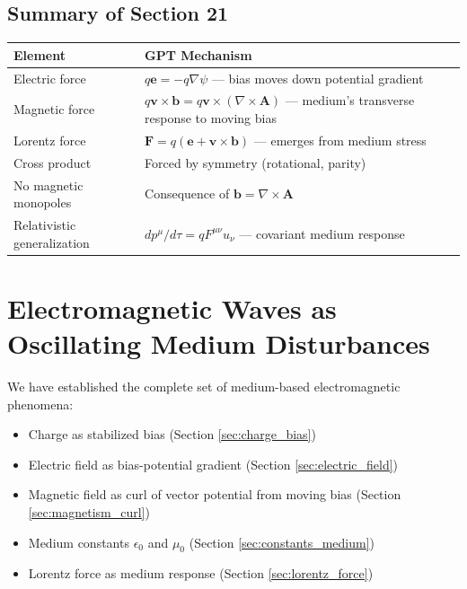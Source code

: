 \documentclass[12pt, a4paper]{article}
\begin{document}
\subsection{Summary of Section 21}
\label{subsec:summary_21}

\begin{center}
\begin{tabular}{|p{4cm}|p{10cm}|}
\hline
\textbf{Element} & \textbf{GPT Mechanism} \\
\hline
Electric force & \( q\mathbf{e} = -q\nabla \psi \) — bias moves down potential gradient \\
\hline
Magnetic force & \( q\mathbf{v} \times \mathbf{b} = q\mathbf{v} \times (\nabla \times \mathbf{A}) \) — medium's transverse response to moving bias \\
\hline
Lorentz force & \( \mathbf{F} = q(\mathbf{e} + \mathbf{v} \times \mathbf{b}) \) — emerges from medium stress \\
\hline
Cross product & Forced by symmetry (rotational, parity) \\
\hline
No magnetic monopoles & Consequence of \( \mathbf{b} = \nabla \times \mathbf{A} \) \\
\hline
Relativistic generalization & \( dp^\mu/d\tau = q F^{\mu\nu} u_\nu \) — covariant medium response \\
\hline
\end{tabular}
\end{center}

\section{Electromagnetic Waves as Oscillating Medium Disturbances}
\label{sec:em_waves}

We have established the complete set of medium-based electromagnetic phenomena:
\begin{itemize}
    \item Charge as stabilized bias (Section \ref{sec:charge_bias})
    \item Electric field as bias-potential gradient (Section \ref{sec:electric_field})
    \item Magnetic field as curl of vector potential from moving bias (Section \ref{sec:magnetism_curl})
    \item Medium constants \( \epsilon_0 \) and \( \mu_0 \) (Section \ref{sec:constants_medium})
    \item Lorentz force as medium response (Section \ref{sec:lorentz_force})
\end{itemize}
\end{document}
